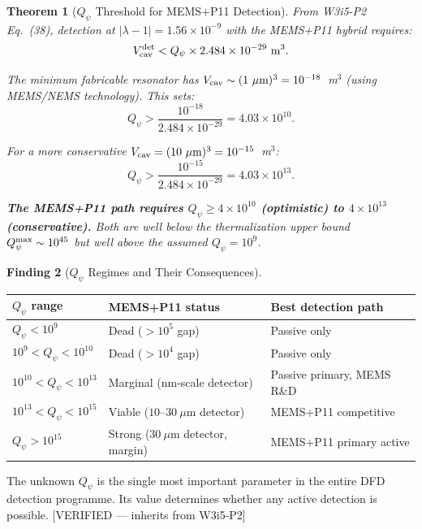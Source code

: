 \documentclass[11pt]{article}
\newcommand{\lam}{\lambda}
\newcommand{\ee}[1]{\times 10^{#1}}
\newcommand{\Qpsi}{Q_\psi}
\newcommand{\Vcav}{V_{\rm cav}}
\newcommand{\lbone}{|\lam - 1|}
\newtheorem{theorem}{Theorem}[section]
\theoremstyle{definition}
\newtheorem{finding}[theorem]{Finding}
\theoremstyle{remark}
\begin{document}
\begin{theorem}[$\Qpsi$ Threshold for MEMS+P11 Detection]
\label{thm:Qpsi_threshold}
From W3i5-P2 Eq.~(38), detection at $\lbone = 1.56\ee{-9}$ with the
MEMS+P11 hybrid requires:
\begin{equation}
\Vcav^{\rm det} < \Qpsi \times 2.484\ee{-29}~\text{m}^3.
\label{eq:Vcav_Qpsi}
\end{equation}

The minimum fabricable resonator has $\Vcav \sim (1~\mu\text{m})^3
= 10^{-18}$~m$^3$ (using MEMS/NEMS technology). This sets:
\begin{equation}
\Qpsi > \frac{10^{-18}}{2.484\ee{-29}} = 4.03\ee{10}.
\label{eq:Qpsi_min}
\end{equation}

For a more conservative $\Vcav = (10~\mu\text{m})^3 = 10^{-15}$~m$^3$:
\begin{equation}
\Qpsi > \frac{10^{-15}}{2.484\ee{-29}} = 4.03\ee{13}.
\label{eq:Qpsi_conservative}
\end{equation}

\textbf{The MEMS+P11 path requires $\Qpsi \geq 4\ee{10}$ (optimistic)
to $4\ee{13}$ (conservative).} Both are well below the thermalization
upper bound $\Qpsi^{\rm max} \sim 10^{45}$ but well above the assumed
$\Qpsi = 10^9$.
\end{theorem}

\begin{finding}[$\Qpsi$ Regimes and Their Consequences]
\label{find:Qpsi_regimes}
\begin{center}
\renewcommand{\arraystretch}{1.2}
\begin{tabular}{@{}lll@{}}
\toprule
\textbf{$\Qpsi$ range} & \textbf{MEMS+P11 status} &
  \textbf{Best detection path} \\
\midrule
$\Qpsi < 10^{9}$ & Dead ($>10^5$ gap) & Passive only \\
$10^{9} < \Qpsi < 10^{10}$ & Dead ($>10^4$ gap) & Passive only \\
$10^{10} < \Qpsi < 10^{13}$ & Marginal (nm-scale detector) & Passive primary,
  MEMS R\&D \\
$10^{13} < \Qpsi < 10^{15}$ & Viable ($10$--$30~\mu$m detector) &
  MEMS+P11 competitive \\
$\Qpsi > 10^{15}$ & Strong ($30~\mu$m detector, margin) &
  MEMS+P11 primary active \\
\bottomrule
\end{tabular}
\end{center}

The unknown $\Qpsi$ is the single most important parameter in the entire
DFD detection programme. Its value determines whether any active detection
is possible. [VERIFIED --- inherits from W3i5-P2]
\end{finding}
\end{document}
